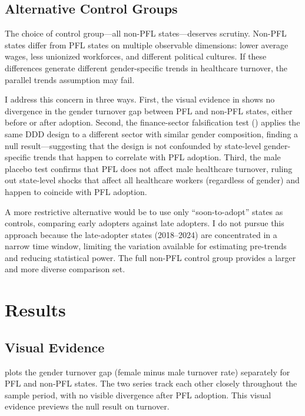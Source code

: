 \documentclass[12pt]{article}
\begin{document}
\subsection{Alternative Control Groups}

The choice of control group---all non-PFL states---deserves scrutiny. Non-PFL states differ from PFL states on multiple observable dimensions: lower average wages, less unionized workforces, and different political cultures. If these differences generate different gender-specific trends in healthcare turnover, the parallel trends assumption may fail.

I address this concern in three ways. First, the visual evidence in  shows no divergence in the gender turnover gap between PFL and non-PFL states, either before or after adoption. Second, the finance-sector falsification test () applies the same DDD design to a different sector with similar gender composition, finding a null result---suggesting that the design is not confounded by state-level gender-specific trends that happen to correlate with PFL adoption. Third, the male placebo test confirms that PFL does not affect male healthcare turnover, ruling out state-level shocks that affect all healthcare workers (regardless of gender) and happen to coincide with PFL adoption.

A more restrictive alternative would be to use only ``soon-to-adopt'' states as controls, comparing early adopters against late adopters. I do not pursue this approach because the late-adopter states (2018--2024) are concentrated in a narrow time window, limiting the variation available for estimating pre-trends and reducing statistical power. The full non-PFL control group provides a larger and more diverse comparison set.


\section{Results}\label{sec:results}

\subsection{Visual Evidence}

 plots the gender turnover gap (female minus male turnover rate) separately for PFL and non-PFL states. The two series track each other closely throughout the sample period, with no visible divergence after PFL adoption. This visual evidence previews the null result on turnover.
\end{document}
